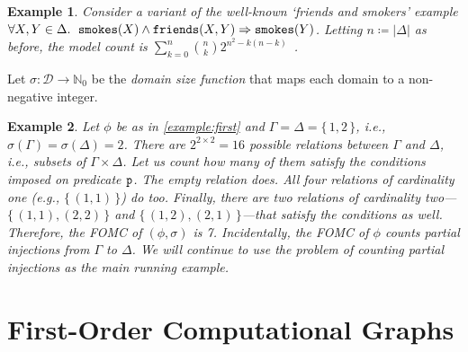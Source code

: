 \documentclass{article}
\newtheorem{example}{Example}
\newcommand{\predicate}{\texttt{\textup{p}}}
\DeclareMathOperator{\friends}{\texttt{\textup{friends}}}
\DeclareMathOperator{\smokes}{\texttt{\textup{smokes}}}
\begin{document}
\begin{example}\label{example:smokers}
  Consider a variant of the well-known `friends and smokers' example
  $\forall X, Y \in \Delta\text{.
  } \smokes(X) \land \friends(X, Y) \Rightarrow \smokes(Y)$. Letting
  $n \coloneqq |\Delta|$ as before, the model count is
  $\sum_{k=0}^{n} \binom{n}{k}2^{n^{2} - k(n-k)}$~\cite{DBLP:conf/kr/BroeckMD14}.
\end{example}

Let $\sigma\colon \mathcal{D} \to \mathbb{N}_{0}$ be the \emph{domain size
  function} that maps each domain to a non-negative integer.


\begin{example}
  Let $\phi$ be as in \cref{example:first} and $\Gamma = \Delta = \{\,1, 2\,\}$,
  i.e., $\sigma(\Gamma) = \sigma(\Delta) = 2$. There are $2^{2 \times 2} = 16$
  possible relations between $\Gamma$ and $\Delta$, i.e., subsets of
  $\Gamma \times \Delta$. Let us count how many of them satisfy the conditions
  imposed on predicate $\predicate$. The empty relation does. All four relations
  of cardinality one (e.g., $\{\, (1, 1) \,\}$) do too. Finally, there are two
  relations of cardinality two---$\{\, (1, 1), (2, 2) \,\}$ and
  $\{\, (1, 2), (2, 1) \,\}$---that satisfy the conditions as well. Therefore,
  the FOMC of $(\phi, \sigma)$ is 7. Incidentally, the FOMC of $\phi$ counts
  partial injections from $\Gamma$ to $\Delta$. We will continue to use the
  problem of counting partial injections as the main running example.
\end{example}

\section{First-Order Computational Graphs}\label{sec:methods}
\end{document}
